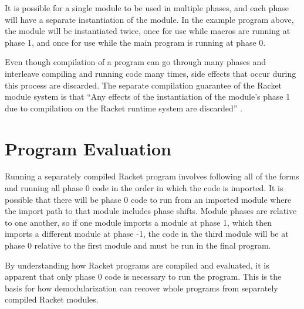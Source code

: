 It is possible for a single module to be used in multiple phases, and each phase will have a separate instantiation of the module.
In the example program above, the  module will be instantiated twice, once for use while macros are running at phase 1, and once for use while the main program is running at phase 0.

Even though compilation of a program can go through many phases and interleave compiling and running code many times, side effects that occur during this process are discarded. 
The separate compilation guarantee of the Racket module system is that ``Any effects of the instantiation of the module's phase 1 due to compilation on the Racket runtime system are discarded'' \cite{sep}. 

\section{Program Evaluation}
Running a separately compiled Racket program involves following all of the  forms and running all phase 0 code in the order in which the code is imported.
It is possible that there will be phase 0 code to run from an imported module where the import path to that module includes phase shifts.
Module phases are relative to one another, so if one module imports a module at phase 1, which then imports a different module at phase -1, the code in the third module will be at phase 0 relative to the first module and must be run in the final program.

By understanding how Racket programs are compiled and evaluated, it is apparent that only phase 0 code is necessary to run the program. 
This is the basis for how demodularization can recover whole programs from separately compiled Racket modules. 
